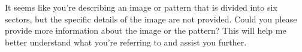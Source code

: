 It seems like you're describing an image or pattern that is divided into six sectors, but the specific details of the image are not provided. Could you please provide more information about the image or the pattern? This will help me better understand what you're referring to and assist you further.